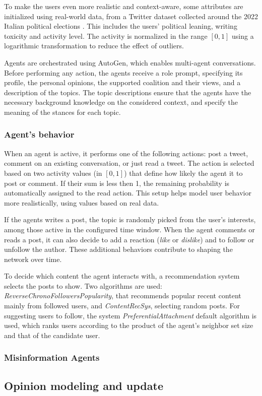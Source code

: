 To make the users even more realistic and context-aware, some attributes are initialized using real-world data, from a Twitter dataset collected around the 2022 Italian political elections \cite{pierri2023ita}.
This includes the users' political leaning, writing toxicity and activity level.
The activity is normalized in the range $[0,1]$ using a logarithmic transformation to reduce the effect of outliers.

Agents are orchestrated using AutoGen, which enables multi-agent conversations.
Before performing any action, the agents receive a role prompt, specifying its profile, the personal opinions, the supported coalition and their views, and a description of the topics.
The topic descriptions ensure that the agents have the necessary background knowledge on the considered context, and specify the meaning of the stances for each topic.


\subsubsection{Agent's behavior}
When an agent is active, it performs one of the following actions: post a tweet, comment on an existing conversation, or just read a tweet.
The action is selected based on two activity values (in $[0,1]$) that define how likely the agent it to post or comment.
If their sum is less then 1, the remaining probability is automatically assigned to the read action.
This setup helps model user behavior more realistically, using values based on real data.

If the agents writes a post, the topic is randomly picked from the user's interests, among those active in the configured time window.
When the agent comments or reads a post, it can also decide to add a reaction (\textit{like} or \textit{dislike}) and to follow or unfollow the author.
These additional behaviors contribute to shaping the network over time.

To decide which content the agent interacts with, a recommendation system selects the posts to show. Two algorithms are used: \textit{ReverseChronoFollowersPopularity}, that recommends popular recent content mainly from followed users, and \textit{ContentRecSys}, selecting random posts.
For suggesting users to follow, the system \textit{PreferentialAttachment} default algorithm is used, which ranks users according to the product of the agent’s neighbor set size and that of the candidate user.


\subsubsection{Misinformation Agents}


\subsection{Opinion modeling and update}
